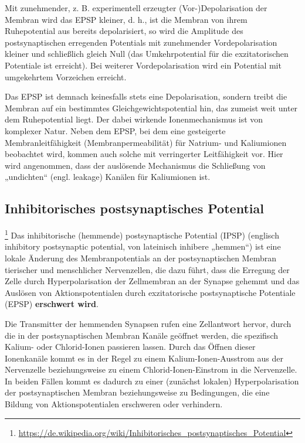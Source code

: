 Mit zunehmender, z. B. experimentell erzeugter (Vor-)Depolarisation der Membran wird das EPSP kleiner, d. h., ist die Membran von ihrem Ruhepotential aus bereits depolarisiert, so wird die Amplitude des postsynaptischen erregenden Potentials mit zunehmender Vordepolarisation kleiner und schließlich gleich Null (das Umkehrpotential für die exzitatorischen Potentiale ist erreicht). Bei weiterer Vordepolarisation wird ein Potential mit umgekehrtem Vorzeichen erreicht.

Das EPSP ist demnach keinesfalls stets eine Depolarisation, sondern treibt die Membran auf ein bestimmtes Gleichgewichtspotential hin, das zumeist weit unter dem Ruhepotential liegt. Der dabei wirkende Ionenmechanismus ist von komplexer Natur. Neben dem EPSP, bei dem eine gesteigerte Membranleitfähigkeit (Membranpermeabilität) für Natrium- und Kaliumionen beobachtet wird, kommen auch solche mit verringerter Leitfähigkeit vor. Hier wird angenommen, dass der auslösende Mechanismus die Schließung von „undichten“ (engl. leakage) Kanälen für Kaliumionen ist.

\subsection{Inhibitorisches postsynaptisches Potential}\footnote{\url{https://de.wikipedia.org/wiki/Inhibitorisches_postsynaptisches_Potential}} Das inhibitorische (hemmende) postsynaptische Potential (IPSP) (englisch inhibitory postsynaptic potential, von lateinisch inhibere „hemmen“) ist eine lokale Änderung des Membranpotentials an der postsynaptischen Membran tierischer und menschlicher Nervenzellen, die dazu führt, dass die Erregung der Zelle durch Hyperpolarisation der Zellmembran an der Synapse gehemmt und das Auslösen von Aktionspotentialen durch exzitatorische postsynaptische Potentiale (EPSP) \textbf{erschwert wird}.

Die Transmitter der hemmenden Synapsen rufen eine Zellantwort hervor, durch die in der postsynaptischen Membran Kanäle geöffnet werden, die spezifisch Kalium- oder Chlorid-Ionen passieren lassen. Durch das Öffnen dieser Ionenkanäle kommt es in der Regel zu einem Kalium-Ionen-Ausstrom aus der Nervenzelle beziehungsweise zu einem Chlorid-Ionen-Einstrom in die Nervenzelle. In beiden Fällen kommt es dadurch zu einer (zunächst lokalen) Hyperpolarisation der postsynaptischen Membran beziehungsweise zu Bedingungen, die eine Bildung von Aktionspotentialen erschweren oder verhindern.

